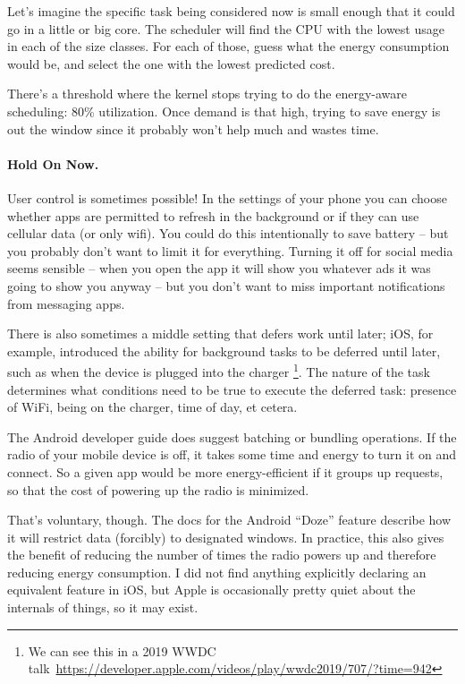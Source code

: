 Let's imagine the specific task being considered now is small enough that it could go in a little or big core. The scheduler will find the CPU with the lowest usage in each of the size classes. For each of those, guess what the energy consumption would be, and select the one with the lowest predicted cost. 

There's a threshold where the kernel stops trying to do the energy-aware scheduling: 80\% utilization. Once demand is that high, trying to save energy is out the window since it probably won't help much and wastes time. 

\paragraph{Hold On Now.}

User control is sometimes possible! In the settings of your phone you can choose whether apps are permitted to refresh in the background or if they can use cellular data (or only wifi). You could do this intentionally to save battery -- but you probably don't want to limit it for everything. Turning it off for social media seems sensible -- when you open the app it will show you whatever ads it was going to show you anyway -- but you don't want to miss important notifications from messaging apps. 

There is also sometimes a middle setting that defers work until later; iOS, for example, introduced the ability for background tasks to be deferred until later, such as when the device is plugged into the charger \footnote{ We can see this in a 2019 WWDC talk~\url{https://developer.apple.com/videos/play/wwdc2019/707/?time=942}}. The nature of the task determines what conditions need to be true to execute the deferred task: presence of WiFi, being on the charger, time of day, et cetera. 

The Android developer guide does suggest batching or bundling operations. If the radio of your mobile device is off, it takes some time and energy to turn it on and connect. So a given app would be more energy-efficient if it groups up requests, so that the cost of powering up the radio is minimized. 

That's voluntary, though. The docs for the Android ``Doze'' feature describe how it will restrict data (forcibly) to designated windows. In practice, this also gives the benefit of reducing the number of times the radio powers up and therefore reducing energy consumption. I did not find anything explicitly declaring an equivalent feature in iOS, but Apple is occasionally pretty quiet about the internals of things, so it may exist.

